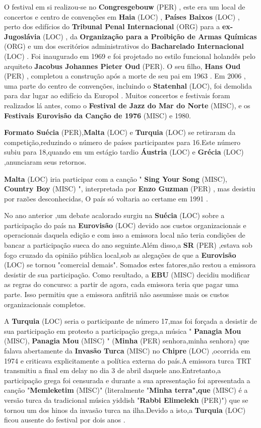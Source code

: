 \documentclass[12pt,a4paper]{article}
\begin{document}
O festival em si realizou-se no \textbf{Congresgebouw} (PER) , este era um local de concertos e centro de convenções em \textbf{Haia} (LOC) , \textbf{Países Baixos} (LOC) , perto dos edifícios do \textbf{Tribunal Penal Internacional} (ORG) para a \textbf{ex-Jugoslávia} (LOC) , da \textbf{Organização para a Proibição de Armas Químicas} (ORG) e um dos escritórios administrativos do \textbf{Bacharelado Internacional} (LOC) . Foi inaugurado em 1969 e foi projetado no estilo funcional holandês pelo arquiteto \textbf{Jacobus Johannes Pieter Oud} (PER). O seu filho, \textbf{Hans Oud} (PER) , completou a construção após a morte de seu pai em 1963 . Em 2006 , uma parte do centro de convenções, incluindo o \textbf{Statenhal} (LOC), foi demolida para dar lugar ao edifício da Europol . Muitos concertos e festivais foram realizados lá antes, como o \textbf{Festival de Jazz do Mar do Norte} (MISC), e os \textbf{Festivais Eurovisão da Canção de 1976} (MISC) e 1980.



\textbf{Formato Suécia} (PER),\textbf{Malta} (LOC) e \textbf{Turquia} (LOC) se retiraram da competição,reduzindo o número de países participantes para 16.Este número subiu para 18,quando em um estágio tardio \textbf{Áustria} (LOC) e \textbf{Grécia} (LOC) ,anunciaram seus retornos.

\textbf{Malta} (LOC) iria participar com a canção " \textbf{Sing Your Song} (MISC), \textbf{Country Boy} (MISC) ", interpretada por \textbf{Enzo Guzman} (PER) , mas desistiu por razões desconhecidas, O país só voltaria ao certame em 1991 .

No ano anterior ,um debate acalorado surgiu na \textbf{Suécia} (LOC) sobre a participação do país na \textbf{Eurovisão} (LOC) devido aos custos organizacionais e operacionais daquela edição e com isso a emissora local não teria condições de bancar a participação sueca do ano seguinte.Além disso,a \textbf{SR} (PER) ,estava sob fogo cruzado da opinião pública local,sob as alegações de que a \textbf{Eurovisão} (LOC) se tornou "comercial demais". Somados estes fatores,não restou a emissora desistir de sua participação. Como resultado, a \textbf{EBU} (MISC) decidiu modificar as regras do concurso: a partir de agora, cada emissora teria que pagar uma parte. Isso permitiu que a emissora anfitriã não assumisse mais os custos organizacionais completos.

A \textbf{Turquia} (LOC) seria o participante de número 17,mas foi forçada a desistir de sua participação em protesto a participação grega,a música " \textbf{Panagia Mou} (MISC), \textbf{Panagia Mou} (MISC) " (\textbf{Minha} (PER) senhora,minha senhora) que falava abertamente da \textbf{Invasão Turca} (MISC) no \textbf{Chipre} (LOC) ,ocorrida em 1974 e criticava explicitamente a política externa do país.A emissora turca TRT transmitiu a final em delay no dia 3 de abril daquele ano.Entretanto,a participação grega foi censurada e durante a sua apresentação foi apresentada a canção "\textbf{Memleketim} (MISC)" (literalmente "\textbf{Minha terra",que} (MISC) é a versão turca da tradicional música yiddish "\textbf{Rabbi Elimelekh} (PER)") que se tornou um dos hinos da invasão turca na ilha.Devido a isto,a \textbf{Turquia} (LOC) ficou ausente do festival por dois anos .
\end{document}
